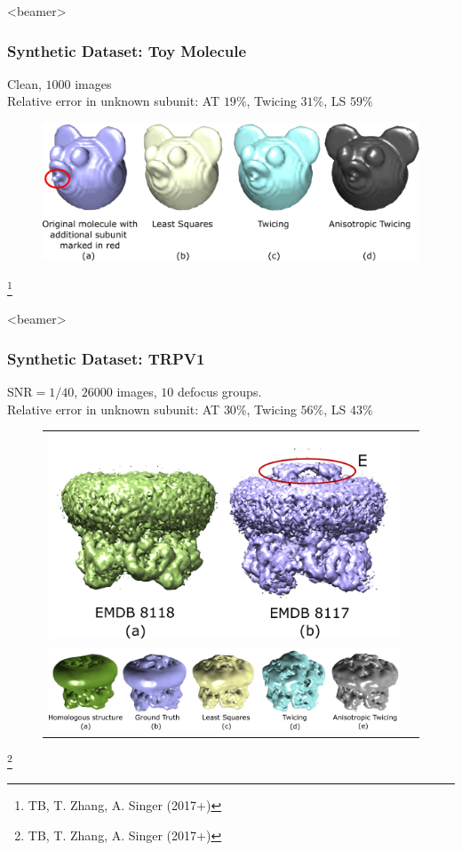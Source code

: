 \documentclass{beamer}
\newcommand\blfootnote[1]{%
  \begingroup
  \renewcommand\thefootnote{}\footnote{#1}%
  \addtocounter{footnote}{-1}%
  \endgroup
}
\begin{document}
\begin{frame}<beamer>
\frametitle{Synthetic Dataset: Toy Molecule }
Clean, $1000$ images\\
Relative error in unknown subunit: AT $19\%$, Twicing $31\%$, LS $59\%$ 
\begin{figure}[!htbp]
\begin{center}
\includegraphics[scale=0.16]{figures/mickey.pdf}
\end{center}
\end{figure}\blfootnote{TB, T. Zhang, A. Singer (2017+)}

\end{frame}

\begin{frame}<beamer>
\frametitle{Synthetic Dataset: TRPV1 }
SNR$=1/40$, $26000$ images, $10$ defocus groups.\\ 
Relative error in unknown subunit: AT $30\%$, Twicing $56\%$, LS $43\%$ 
\begin{figure}[!htbp]
\begin{tabular}{cc}
\includegraphics[width=0.4\linewidth]{figures/sim8117_compare.pdf}\label{fig:simtrpv_emdb} \\
\includegraphics[width=0.9\linewidth]{figures/sim8117.pdf}\label{fig:simtrpv_res}\\
\end{tabular}
\end{figure}\blfootnote{TB, T. Zhang, A. Singer (2017+)}

\end{frame}
\end{document}
